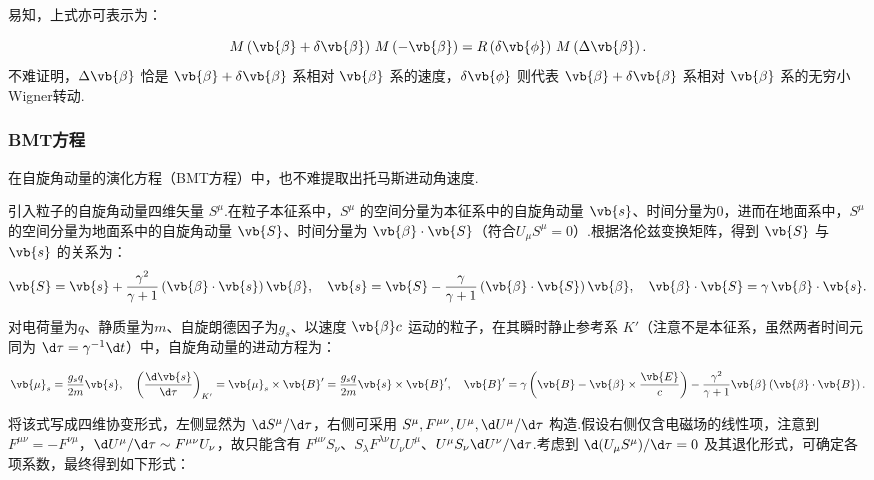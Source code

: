 易知，上式亦可表示为：

\begin{equation*}
	M\left( \vb{\beta} + \delta\vb{\beta} \right) \, M\left( -\vb{\beta} \right)
	= R\left( \delta\vb{\phi} \right) \, M\left( \Delta\vb{\beta} \right).
\end{equation*}
不难证明，\(\Delta\vb{\beta}\) 恰是 \(\vb{\beta} + \delta\vb{\beta}\) 系相对 \(\vb{\beta}\) 系的速度，\(\delta\vb{\phi}\) 则代表 \(\vb{\beta} + \delta\vb{\beta}\) 系相对 \(\vb{\beta}\) 系的无穷小Wigner转动.

\subsubsection{BMT方程}
在自旋角动量的演化方程（BMT方程）中，也不难提取出托马斯进动角速度.

引入粒子的自旋角动量四维矢量 \(S^\mu\).在粒子本征系中，\(S^\mu\) 的空间分量为本征系中的自旋角动量 \(\vb{s}\)、时间分量为0，进而在地面系中，\(S^\mu\) 的空间分量为地面系中的自旋角动量 \(\vb{S}\)、时间分量为 \(\vb{\beta} \cdot \vb{S}\)（符合\(U_\mu S^\mu = 0\)）.根据洛伦兹变换矩阵，得到 \(\vb{S}\) 与 \(\vb{s}\) 的关系为：
\begin{equation*}
	\vb{S} = \vb{s} + \dfrac{\gamma^2}{\gamma + 1} \left( \vb{\beta} \cdot \vb{s} \right) \vb{\beta}, \quad
	\vb{s} = \vb{S} - \dfrac{\gamma}{\gamma + 1} \left( \vb{\beta} \cdot \vb{S} \right) \vb{\beta}, \quad
	\vb{\beta} \cdot \vb{S} = \gamma \, \vb{\beta} \cdot \vb{s}.
\end{equation*}

对电荷量为\(q\)、静质量为\(m\)、自旋朗德因子为\(g_s\)、以速度 \(\vb{\beta} c\) 运动的粒子，在其瞬时静止参考系 \(K'\)（注意不是本征系，虽然两者时间元同为 \(\d \tau = \gamma^{-1} \d t\)）中，自旋角动量的进动方程为：

\begin{equation*}
	\vb{\mu}_s = \dfrac{g_s q}{2m} \vb{s}, \quad
	\left( \dfrac{\d \vb{s}}{\d \tau} \right)_{K'} = \vb{\mu}_s \times \vb{B}' = \dfrac{g_s q}{2m} \vb{s} \times \vb{B}',\quad
	\vb{B}' = \gamma \left( \vb{B} - \vb{\beta} \times \dfrac{\vb{E}}{c} \right) - \dfrac{\gamma^2}{\gamma + 1} \vb{\beta} \left( \vb{\beta} \cdot \vb{B} \right).
\end{equation*}

将该式写成四维协变形式，左侧显然为 \(\d S^\mu/\d \tau\)，右侧可采用 \(S^\mu, F^{\mu\nu}, U^\mu,\d U^\mu/\d \tau\) 构造.假设右侧仅含电磁场的线性项，注意到 \(F^{\mu\nu} = -F^{\nu\mu}\)，\(\d U^\mu/\d \tau \sim F^{\mu\nu} U_\nu\)，故只能含有 \(F^{\mu\nu} S_\nu\)、\(S_\lambda F^{\lambda\nu} U_\nu U^\mu\)、\(U^\mu S_\nu \d U^\nu/\d \tau\).考虑到 \(\d(U_\mu S^\mu)/\d \tau = 0\) 及其退化形式，可确定各项系数，最终得到如下形式：

